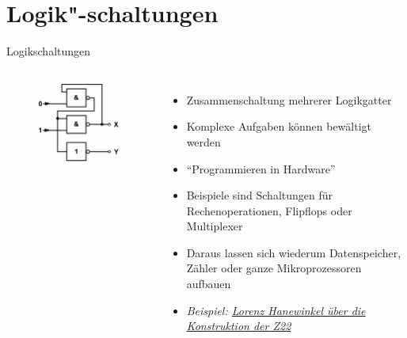 \section{Logik"-schaltungen}
\begin{frame}{Logikschaltungen}
  \begin{columns}
    \begin{figure}
      \includegraphics[width=\textwidth,height=.7\textheight,keepaspectratio]{a14/tc704.png}
    \end{figure}
    \begin{itemize}
      \item Zusammenschaltung mehrerer Logikgatter
      \item Komplexe Aufgaben können bewältigt werden
      \item ``Programmieren in Hardware''
      \item Beispiele sind Schaltungen für Rechenoperationen, Flipflops oder Multiplexer
      \item Daraus lassen sich wiederum Datenspeicher, Zähler oder ganze Mikroprozessoren aufbauen
      \item \emph{Beispiel: \href{https://media.ccc.de/v/gpn14_-_5862_-__-_medientheater_-_201406211600_-_zuse_z22_-_lorenz_hanewinkel}{\ExternalLink Lorenz Hanewinkel über die Konstruktion der Z22}}
    \end{itemize}
  \end{columns}
\end{frame}

